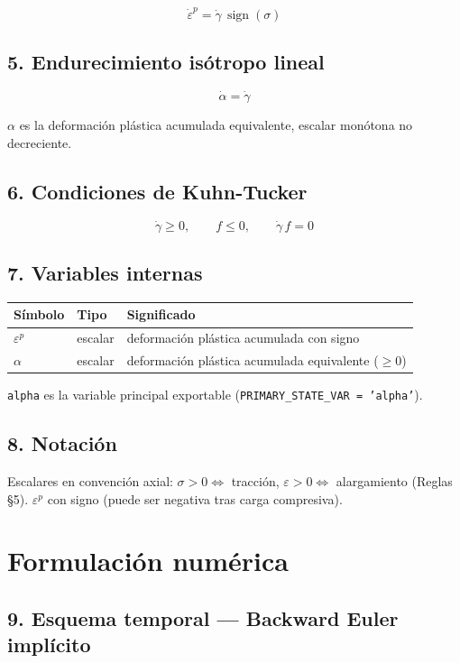\documentclass[11pt,letterpaper,oneside]{report}
\begin{document}
\[
\dot\varepsilon^p = \dot\gamma\,\operatorname{sign}(\sigma)
\]

\subsection{5. Endurecimiento isótropo lineal}

\[
\dot\alpha = \dot\gamma
\]

$\alpha$ es la deformación plástica acumulada equivalente, escalar monótona no decreciente.

\subsection{6. Condiciones de Kuhn-Tucker}

\[
\dot\gamma \geq 0, \qquad f \leq 0, \qquad \dot\gamma\,f = 0
\]

\subsection{7. Variables internas}

\begin{center}
\begin{tabularx}{\textwidth}{YYY}
\hline
\textbf{Símbolo} & \textbf{Tipo} & \textbf{Significado} \\
\hline
$\varepsilon^p$ & escalar & deformación plástica acumulada con signo \\
$\alpha$ & escalar & deformación plástica acumulada equivalente (\ensuremath{\ge}0) \\
\hline
\end{tabularx}
\end{center}
\texttt{alpha} es la variable principal exportable (\texttt{PRIMARY\_STATE\_VAR = 'alpha'}).

\subsection{8. Notación}

Escalares en convención axial: $\sigma > 0 \Leftrightarrow$ tracción, $\varepsilon > 0 \Leftrightarrow$ alargamiento (Reglas §5). $\varepsilon^p$ con signo (puede ser negativa tras carga compresiva).


\section{Formulación numérica}

\subsection{9. Esquema temporal --- Backward Euler implícito}
\end{document}
